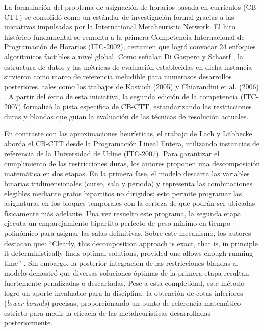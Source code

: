 \documentclass[letter, 10pt]{article}
\begin{document}
La formulación del problema de asignación de horarios basada en currículos (CB-CTT) se consolidó como un estándar de investigación formal gracias a las iniciativas impulsadas por la International Metaheuristic Network. El hito histórico fundamental se remonta a la primera Competencia Internacional de Programación de Horarios (ITC-2002), certamen que logró convocar 24 enfoques algorítmicos factibles a nivel global. Como señalan Di Gaspero y Schaerf \cite{digaspero2007}, la estructura de datos y las métricas de evaluación establecidas en dicha instancia sirvieron como marco de referencia ineludible para numerosos desarrollos posteriores, tales como los trabajos de Kostuch (2005) y Chiarandini et al. (2006) \cite{digaspero2007}. A partir del éxito de esta iniciativa, la segunda edición de la competencia (ITC-2007) formalizó la pista específica de CB-CTT, estandarizando las restricciones duras y blandas que guían la evaluación de las técnicas de resolución actuales.

En contraste con las aproximaciones heurísticas, el trabajo de Lach y L\"{u}bbecke \cite{lach2012} aborda el CB-CTT desde la Programación Lineal Entera, utilizando instancias de referencia de la Universidad de Udine (ITC-2007). Para garantizar el cumplimiento de las restricciones duras, los autores proponen una descomposición matemática en dos etapas. En la primera fase, el modelo descarta las variables binarias tridimensionales (curso, sala y periodo) y representa las combinaciones elegibles mediante grafos bipartitos no dirigidos; esto permite programar las asignaturas en los bloques temporales con la certeza de que podrán ser ubicadas físicamente más adelante. Una vez resuelto este programa, la segunda etapa ejecuta un emparejamiento bipartito perfecto de peso mínimo en tiempo polinómico para asignar las salas definitivas. Sobre este mecanismo, los autores destacan que: ``Clearly, this decomposition approach is exact, that is, in principle it deterministically finds optimal solutions, provided one allows enough running time'' \cite{lach2012}. Sin embargo, la posterior integración de las restricciones blandas al modelo demostró que diversas soluciones óptimas de la primera etapa resultan fuertemente penalizadas o descartadas. Pese a esta complejidad, este método logró un aporte invaluable para la disciplina: la obtención de cotas inferiores (\textit{lower bounds}) precisas, proporcionando un punto de referencia matemático estricto para medir la eficacia de las metaheurísticas desarrolladas posteriormente.
\end{document}
